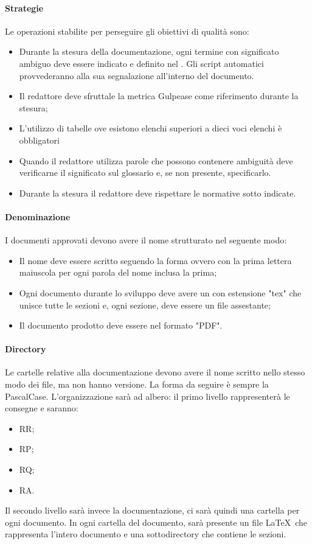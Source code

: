 \documentclass[../NormeDiProgetto_v3.0.0.tex]{subfiles}
\begin{document}
			\paragraph{Strategie}
				Le operazioni stabilite per perseguire gli obiettivi di qualità sono:
				\begin{itemize}
					\item Durante la stesura della documentazione, ogni termine con significato ambiguo deve essere indicato e definito nel \glossario. Gli script automatici provvederanno alla sua segnalazione all'interno del documento.
					\item Il redattore deve sfruttale la metrica Gulpease come riferimento durante la stesura;
					\item L'utilizzo di tabelle ove esistono elenchi superiori a dieci voci elenchi è obbligatori
					\item Quando il redattore utilizza parole che possono contenere ambiguità deve verificarne il significato sul glossario e, se non presente, specificarlo.
					\item Durante la stesura il redattore deve rispettare le normative sotto indicate. 
				\end{itemize}


			\paragraph{Denominazione}
				I documenti approvati devono avere il nome strutturato nel seguente modo:
				\begin{itemize}
				\item Il nome deve essere scritto seguendo la forma  ovvero con la prima lettera maiuscola per ogni parola del nome inclusa la prima;
				\item Ogni documento durante lo sviluppo deve avere un con estensione "tex" che unisce tutte le sezioni e, ogni sezione, deve essere un file assestante;
				\item Il documento prodotto deve essere nel formato "PDF".
				\end{itemize}

			\paragraph{Directory}
				Le cartelle relative alla documentazione devono avere il nome scritto nello stesso modo dei file, ma non hanno versione. La forma da seguire è sempre la PascalCase.
				L'organizzazione sarà ad albero: il primo livello rappresenterà le consegne e saranno:
				\begin{itemize}
				\item RR;
				\item RP;
				\item RQ;
				\item RA.				
				\end{itemize}
				Il secondo livello sarà invece la documentazione, ci sarà quindi una cartella per ogni documento.
				In ogni cartella del documento, sarà presente un file \LaTeX\ che rappresenta l'intero documento e una sottodirectory che contiene le sezioni.
\end{document}
